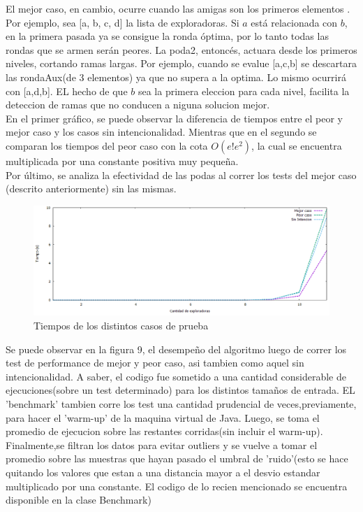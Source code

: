 \documentclass[10pt, a4paper]{article}
\begin{document}
El mejor caso, en cambio, ocurre cuando las amigas son los primeros elementos . Por ejemplo, sea [a, b, c, d] la lista de exploradoras. Si $a$ está relacionada con $b$, en la primera pasada ya se consigue la ronda óptima, por lo tanto todas las rondas que se armen serán peores. La poda2, entoncés, actuara desde los primeros niveles, cortando ramas largas. Por ejemplo, cuando se evalue [a,c,b] se descartara las rondaAux(de 3 elementos) ya que no supera a la optima. Lo mismo ocurrirá con [a,d,b]. EL hecho de que $b$ sea la primera eleccion para cada nivel, facilita la deteccion de ramas que no conducen a niguna solucion mejor.\\
En el primer gráfico, se puede observar la diferencia de tiempos entre el peor y mejor caso y los casos sin intencionalidad. Mientras que en el segundo se comparan los tiempos del peor caso con la cota $O(e!e^2)$, la cual se encuentra multiplicada por una constante positiva muy pequeña.\\

Por último, se analiza la efectividad de las podas al correr los tests del mejor caso (descrito anteriormente) sin las mismas.

	\begin{figure}[H]
  		\centering
   	 	\includegraphics[width=1\textwidth]
   	 	{Imagenes/exploradorasGeneral.png}
		\caption{Tiempos de los distintos casos de prueba}
	\end{figure}

	  
	Se puede observar en la figura 9, el desempeño del algoritmo luego de correr los test de performance de mejor y peor caso, asi tambien como aquel sin intencionalidad.
	A saber, el codigo fue sometido a una cantidad considerable de ejecuciones(sobre un test determinado) para los distintos tamaños de entrada. EL 'benchmark' tambien corre los test una cantidad prudencial de veces,previamente, para hacer el 'warm-up' de la maquina virtual de Java. Luego, se toma el promedio de ejecucion sobre las restantes corridas(sin incluir el warm-up). Finalmente,se filtran los datos para evitar outliers y se vuelve a tomar el promedio sobre las muestras que hayan pasado el umbral de 'ruido'(esto se hace quitando los valores que estan a una distancia mayor a el desvio estandar multiplicado por una constante. El codigo de lo recien mencionado se encuentra disponible en la clase Benchmark)
	
\end{document}
